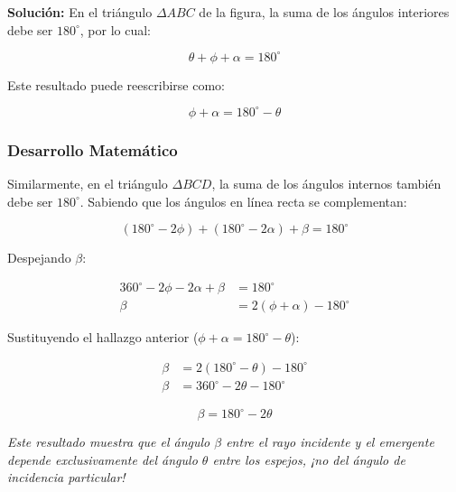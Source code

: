 \documentclass[12pt, a4paper]{article}
\theoremstyle{definition}
\newcommand{\nota}[1]{\medskip\noindent\colorbox{grisclaro}{\parbox{0.95\linewidth}{\textit{#1}}}\medskip}
\begin{document}
\textbf{Solución:} En el triángulo \(\Delta ABC\) de la figura, la suma de los ángulos
interiores debe ser \(180^{\circ}\), por lo cual:

\begin{equation}
  \theta + \phi + \alpha = 180^{\circ}
  \label{eq:triangulo_ABC}
\end{equation}

Este resultado puede reescribirse como:

\begin{equation}
  \phi + \alpha = 180^{\circ} - \theta
  \label{eq:phi_alpha}
\end{equation}

\subsubsection*{Desarrollo Matemático}

Similarmente, en el triángulo \(\Delta BCD\), la suma de los ángulos internos también debe ser
\(180^{\circ}\). Sabiendo que los ángulos en línea recta se complementan:

\begin{equation}
  (180^{\circ} - 2\phi) + (180^{\circ} - 2\alpha) + \beta = 180^{\circ}
  \label{eq:triangulo_BCD}
\end{equation}

Despejando \(\beta\):

\begin{align}
  360^{\circ} - 2\phi - 2\alpha + \beta &= 180^{\circ} \nonumber \\
  \beta &= 2(\phi + \alpha) - 180^{\circ}
  \label{eq:beta_intermedio}
\end{align}

Sustituyendo el hallazgo anterior (\(\phi + \alpha = 180^{\circ} - \theta\)):

\begin{align}
  \beta &= 2(180^{\circ} - \theta) - 180^{\circ} \nonumber \\
  \beta &= 360^{\circ} - 2\theta - 180^{\circ}
  \label{eq:beta_desarrollo}
\end{align}

\begin{equation}
  \boxed{\beta = 180^{\circ} - 2\theta}
  \label{eq:beta_final}
\end{equation}

\nota{Este resultado muestra que el ángulo \(\beta\) entre el rayo incidente y el emergente
depende exclusivamente del ángulo \(\theta\) entre los espejos, ¡no del ángulo de incidencia
particular!}
\end{document}
